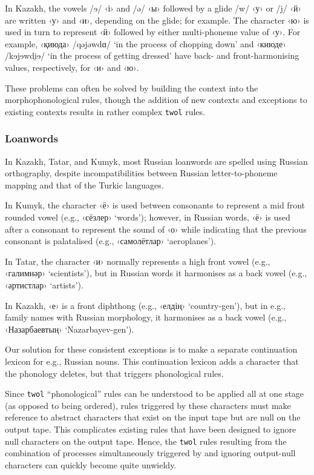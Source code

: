 \documentclass[a4paper,11pt,twocolumn]{article}
\newcommand{\gmk}[1]{{\qgmk #1}}
\begin{document}
In Kazakh, the vowels /{\qipa ɘ}/ ‹і› and /ə/ ‹ы› followed by a glide /w/ ‹у› or /j/ ‹й› are written ‹у› and ‹и›, depending on the glide; for example.  The character ‹ю› is used in turn to represent ‹й› followed by either multi-phoneme value of ‹у›.  For example, ‹қиюда› /qəjəwd{\qipa ɑ}/ `in the process of chopping down' and ‹киюде› /k{\qipa ɘ}j{\qipa ɘ}wd{\qipa i̯ɘ}/ `in the process of getting dressed' have back- and front-harmonising values, respectively, for ‹и› and ‹ю›.

These problems can often be solved by building the context into the morphophonological rules, though the addition of new contexts and exceptions to existing contexts results in rather complex \texttt{twol} rules.

\subsubsection{Loanwords}
In Kazakh, Tatar, and Kumyk, most Russian loanwords are spelled using Russian orthography, despite incompatibilities between Russian letter-to-phoneme mapping and that of the Turkic languages.

In Kumyk, the character ‹ё› is used between consonants to represent a mid front rounded vowel (e.g., ‹сёзлер› `words'); however, in Russian words, ‹ё› is used after a consonant to represent the sound of ‹о› while indicating that the previous consonant is palatalised (e.g., ‹самолётлар› `aeroplanes').

In Tatar, the character ‹и› normally represents a high front vowel (e.g., ‹галимнәр› `scientists'), but in Russian words it harmonises as a back vowel (e.g., ‹артистлар› `artists').

In Kazakh, ‹е› is a front diphthong (e.g., ‹елдің› `country-\gmk{gen}'), but in e.g., family names with Russian morphology, it harmonises as a back vowel (e.g., ‹Назарбаевтың› `Nazarbayev-\gmk{gen}').

Our solution for these consistent exceptions is to make a separate continuation lexicon for e.g., Russian nouns.  This continuation lexicon adds a character that the phonology deletes, but that triggers phonological rules.

Since \texttt{twol} ``phonological'' rules can be understood to be applied all at one stage (as opposed to being ordered), rules triggered by these characters must make reference to abstract characters that exist on the input tape but are null on the output tape.  This complicates existing rules that have been designed to ignore null characters on the output tape.  Hence, the \texttt{twol} rules resulting from the combination of processes simultaneously triggered by and ignoring output-null characters can quickly become quite unwieldy.
\end{document}
